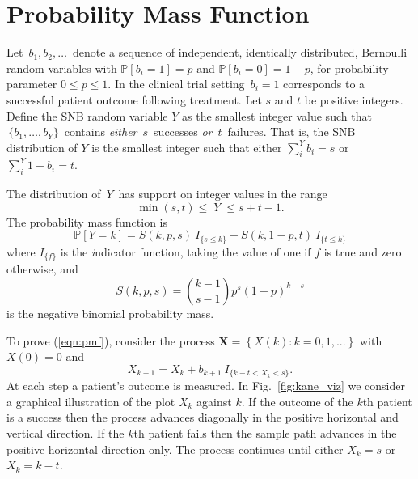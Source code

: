 \documentclass[review]{elsarticle}
\begin{document}
\section{Probability Mass Function}
\label{notation.section}

Let $\,b_1, b_2, \ldots \,$ denote a sequence of independent, identically
distributed, Bernoulli random variables with $\mathbb{P}[b_i=1]=p$ and
$\mathbb{P}[b_i = 0] = 1-p$, for
probability parameter $0\leq p \leq 1$. In the clinical trial setting
$\,b_i = 1$ corresponds to a successful patient outcome following treatment.  
Let $s$ and $t$ be positive integers.  Define the SNB random
variable $Y$ as the smallest
integer value such that $\,\{b_1, \ldots , b_Y\}\,$ contains {\em either}
$\,s\,$ successes {\em or} $\,t\,$ failures. That is, the SNB distribution
of $Y$ is the smallest integer such that either
$\sum_i^Y b_i = s$ or $\sum_i^Y 1-b_i = t$.

The distribution of $\,Y\,$ has support on integer values in the range
\begin{equation*}               
     \min(s,t) \leq \; Y \;\leq s+t-1  \label{range.y.eq}.
\end{equation*}
The probability mass function is
\begin{equation} \label{eqn:pmf}
\mathbb{P} [Y=k] = S(k, p, s) \ I_{\{s \leq k\}} + 
  S(k, 1-p, t) \ I_{\{ t \leq k \}}
\end{equation}
where $I_{\{f\}}$ is the {\emph indicator function}, taking the value 
of one if $f$ is true and zero otherwise, and
\begin{equation} \label{eqn:N}
S(k, p, s) = {k-1 \choose s-1} p^s (1-p)^{k-s} 
\end{equation}
is the negative binomial probability mass.

To prove (\ref{eqn:pmf}), consider the
process $\mathbf{X} = \left\{X(k) : k = 0,1,... \right\}$
with $X(0)=0$ and
\begin{equation*} \label{eqn:proc}
X_{k+1} = X_k + b_{k+1} \ I_{\{ k-t < X_k < s\}}.
\end{equation*}
At each step a patient's outcome is measured. In Fig.~\ref{fig:kane_viz} 
we consider a graphical illustration of the plot $X_k$ against
$k$. If the outcome of the $k$th patient is a success then the process 
advances diagonally in the positive horizontal and vertical direction. 
If the $k$th patient fails
then the sample path advances in the positive horizontal direction only. The
process continues until either $X_k = s$ or $X_k = k-t$.
\end{document}
